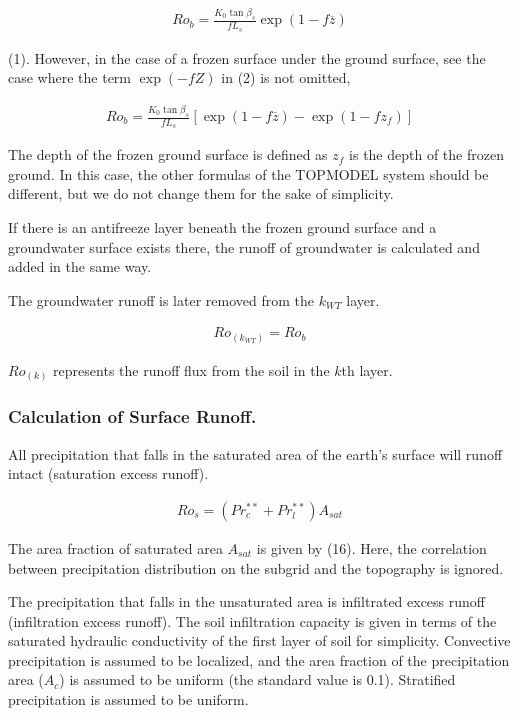 \begin{eqnarray}
 Ro_b = \frac{K_0 \tan\beta_s}{f L_s}\exp(1-f \overline{z})
\end{eqnarray}

(1). However, in the case of a frozen surface under the ground surface,
see the case where the term \(\exp(-fZ)\) in (2) is not omitted,

\begin{eqnarray}
 Ro_b = \frac{K_0 \tan\beta_s}{f L_s}
  [ \exp(1-f \overline{z}) - \exp(1-f z_f) ]
\end{eqnarray}

The depth of the frozen ground surface is defined as \(z_f\) is the
depth of the frozen ground. In this case, the other formulas of the
TOPMODEL system should be different, but we do not change them for the
sake of simplicity.

If there is an antifreeze layer beneath the frozen ground surface and a
groundwater surface exists there, the runoff of groundwater is
calculated and added in the same way.

The groundwater runoff is later removed from the \(k_{WT}\) layer.

\begin{eqnarray}
 Ro_{(k_{WT})} = Ro_b
\end{eqnarray}

\(Ro_{(k)}\) represents the runoff flux from the soil in the \(k\)th
layer.

\hypertarget{calculation-of-surface-runoff.}{%
\subsubsection{Calculation of Surface
Runoff.}\label{calculation-of-surface-runoff.}}

All precipitation that falls in the saturated area of the earth's
surface will runoff intact (saturation excess runoff).

\begin{eqnarray}
 Ro_s = (Pr_c^{**} + Pr_l^{**}) A_{sat}
\end{eqnarray}

The area fraction of saturated area \(A_{sat}\) is given by (16). Here,
the correlation between precipitation distribution on the subgrid and
the topography is ignored.

The precipitation that falls in the unsaturated area is infiltrated
excess runoff (infiltration excess runoff). The soil infiltration
capacity is given in terms of the saturated hydraulic conductivity of
the first layer of soil for simplicity. Convective precipitation is
assumed to be localized, and the area fraction of the precipitation area
(\(A_c\)) is assumed to be uniform (the standard value is 0.1).
Stratified precipitation is assumed to be uniform.

